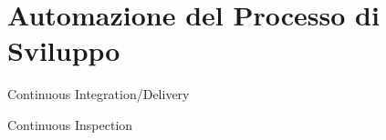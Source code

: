 
\section{Automazione del Processo di Sviluppo}

\begin{frame}{Continuous Integration/Delivery}
    
\end{frame}

\begin{frame}{Continuous Inspection}
    
\end{frame}